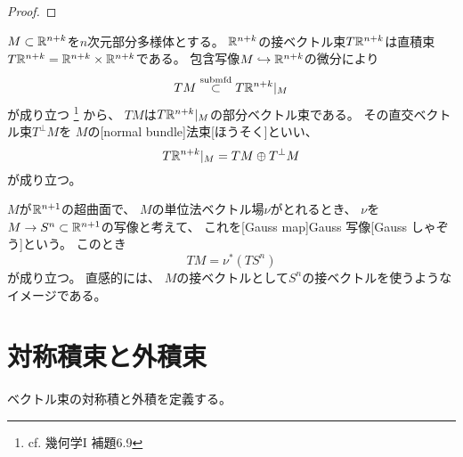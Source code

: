 \documentclass[report]{jlreq}
\begin{document}
\begin{proof}
    \TODO{}
\end{proof}

\begin{example}[法束]
    $M \subset \mathbb{R}^{n+k}$を$n$次元部分多様体とする。
    $\mathbb{R}^{n+k}$の接ベクトル束$T \mathbb{R}^{n+k}$は直積束
    $T \mathbb{R}^{n+k} = \mathbb{R}^{n+k} \times \mathbb{R}^{n+k}$である。
    包含写像$M \hookrightarrow \mathbb{R}^{n+k}$の微分により
    \begin{equation}
        TM \stackrel{\text{submfd}}{\subset} T\mathbb{R}^{n+k}|_M
    \end{equation}
    が成り立つ
    \footnote{
        cf. 幾何学I 補題6.9
    }
    から、
    $TM$は$T\mathbb{R}^{n+k}|_M$の部分ベクトル束である。
    その直交ベクトル束$T^{\perp}M$を
    $M$の[normal bundle]{法束}[ほうそく]といい、
    \begin{equation}
        T\mathbb{R}^{n+k}|_M = TM \oplus T^{\perp}M
    \end{equation}
    が成り立つ。
\end{example}

\begin{example}[Gauss 写像]
    $M$が$\mathbb{R}^{n+1}$の超曲面で、
    $M$の単位法ベクトル場$\nu$がとれるとき、
    $\nu$を$M \to S^n \subset \mathbb{R}^{n+1}$の{\smooth}写像と考えて、
    これを[Gauss map]{Gauss 写像}[Gauss しゃぞう]という。
    このとき
    \begin{equation}
        TM = \nu^*(TS^n)
    \end{equation}
    が成り立つ。
    直感的には、
    $M$の接ベクトルとして$S^n$の接ベクトルを使うようなイメージである。
\end{example}


%
\section{対称積束と外積束}

ベクトル束の対称積と外積を定義する。

\end{document}

